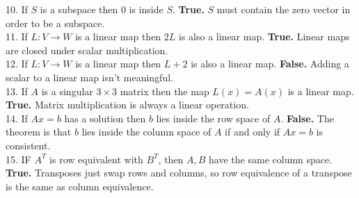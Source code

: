 \documentclass{article}
\begin{document}
10. If $S$ is a subspace then 0 is inside $S$.
    \newline\textbf{True.} $S$ must contain the zero vector in order to be a subspace. \\
11. If $L:V \rightarrow W$ is a linear map then $2L$ is also a linear map.
    \newline\textbf{True.} Linear maps are closed under scalar multiplication. \\
12. If $L:V \rightarrow W$ is a linear map then $L + 2$ is also a linear map.
    \newline\textbf{False.} Adding a scalar to a linear map isn't meaningful. \\
13. If $A$ is a singular $3 \times 3$ matrix then the map $L(x) = A(x)$ is a linear map.
    \newline\textbf{True.} Matrix multiplication is always a linear operation. \\
14. If $Ax = b$ has a solution then $b$ lies inside the row space of $A$.
    \newline\textbf{False.} The theorem is that $b$ lies inside the column space of $A$ if and only if $Ax = b$ is consistent. \\
15. IF $A^T$ is row equivalent with $B^T$, then $A, B$ have the same column space.
    \newline\textbf{True.} Transposes just swap rows and columns, so row equivalence of a transpose is the same as column equivalence. \\
\end{document}
